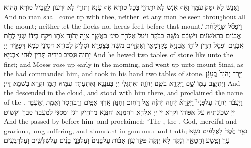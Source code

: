 {וַאֲנָשׁ לָא יִסַּק עִמָּךְ וְאַף אֶנָשׁ לָא יִתַּחְזֵי בְּכָל טוּרָא אַף עָנָא וְתוֹרֵי לָא יִרְעוֹן לָקֳבֵיל טוּרָא הַהוּא׃}
{And no man shall come up with thee, neither let any man be seen throughout all the mount; neither let the flocks nor herds feed before that mount.’}{}
{וַיִּפְסֹ֡ל שְׁנֵֽי\maqqaf לֻחֹ֨ת אֲבָנִ֜ים כָּרִאשֹׁנִ֗ים וַיַּשְׁכֵּ֨ם מֹשֶׁ֤ה בַבֹּ֙קֶר֙ וַיַּ֙עַל֙ אֶל\maqqaf הַ֣ר סִינַ֔י כַּאֲשֶׁ֛ר צִוָּ֥ה יְהֹוָ֖ה אֹת֑וֹ וַיִּקַּ֣ח בְּיָד֔וֹ שְׁנֵ֖י לֻחֹ֥ת אֲבָנִֽים׃}
{וּפְסַל תְּרֵין לוּחֵי אַבְנַיָּא כְּקַדְמָאֵי וְאַקְדֵּים מֹשֶׁה בְּצַפְרָא וּסְלֵיק לְטוּרָא דְּסִינַי כְּמָא דְּפַקֵּיד יְיָ יָתֵיהּ וּנְסֵיב בִּידֵיהּ תְּרֵין לוּחֵי אַבְנַיָּא׃}
{And he hewed two tables of stone like unto the first; and Moses rose up early in the morning, and went up unto mount Sinai, as the \lord\space had commanded him, and took in his hand two tables of stone.}{}
{וַיֵּ֤רֶד יְהֹוָה֙ בֶּֽעָנָ֔ן וַיִּתְיַצֵּ֥ב עִמּ֖וֹ שָׁ֑ם וַיִּקְרָ֥א בְשֵׁ֖ם יְהֹוָֽה׃}
{וְאִתְגְּלִי יְיָ בַּעֲנָנָא וְאִתְעַתַּד עִמֵּיהּ תַּמָּן וּקְרָא בִשְׁמָא דַּייָ׃}
{And the \lord\space descended in the cloud, and stood with him there, and proclaimed the name of the \lord.}{}
{וַיַּעֲבֹ֨ר יְהֹוָ֥ה \pasek  עַל\maqqaf פָּנָיו֮ וַיִּקְרָא֒ יְהֹוָ֣ה \pasek  יְהֹוָ֔ה אֵ֥ל רַח֖וּם וְחַנּ֑וּן אֶ֥רֶךְ אַפַּ֖יִם וְרַב\maqqaf חֶ֥סֶד וֶאֱמֶֽת׃}
{וְאַעְבַּר יְיָ שְׁכִינְתֵיהּ עַל אַפּוֹהִי וּקְרָא יְיָ יְיָ אֱלָהָא רַחְמָנָא וְחַנָּנָא מַרְחֵיק רְגַז וּמַסְגֵּי לְמֶעֱבַד טָבְוָן וּקְשׁוֹט׃}
{And the \lord\space passed by before him, and proclaimed: ‘The \lord, the \lord, God, merciful and gracious, long-suffering, and abundant in goodness and truth;}{}
{\large{נֹ}צֵ֥ר חֶ֙סֶד֙ לָאֲלָפִ֔ים נֹשֵׂ֥א עָוֺ֛ן וָפֶ֖שַׁע וְחַטָּאָ֑ה וְנַקֵּה֙ לֹ֣א יְנַקֶּ֔ה פֹּקֵ֣ד \legarmeh  עֲוֺ֣ן אָב֗וֹת עַל\maqqaf בָּנִים֙ וְעַל\maqqaf בְּנֵ֣י בָנִ֔ים עַל\maqqaf שִׁלֵּשִׁ֖ים וְעַל\maqqaf רִבֵּעִֽים׃}
